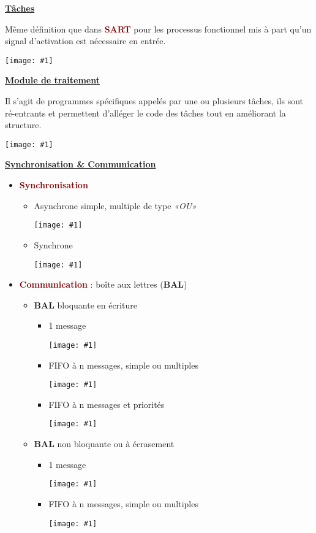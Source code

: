 \documentclass{article}
\newcommand{\dred}[1]{\textcolor{darkred}{\textbf{#1}}}
\newcommand{\imgR}[2]{\begin{center}\texttt{[image: \#1]}\end{center}}
\newcommand{\stitre}[1]{\noindent\textbf{\underline{#1}} \\}
\begin{document}
\stitre{Tâches}

\begin{multicols}{2}
Même définition que dans \dred{SART} pour les processus fonctionnel mis à part qu'un signal d'activation est 
nécessaire en entrée.
\imgR{ITR_013.png}{150}
\end{multicols}

\stitre{Module de traitement}

\begin{multicols}{2}
Il s'agit de programmes spécifiques appelés par une ou plusieurs tâches, ils sont ré-entrants et permettent 
d'alléger le code des tâches tout en améliorant la structure.
\imgR{ITR_014.png}{150}
\end{multicols}

\stitre{Synchronisation \& Communication}

\begin{itemize}
\item \dred{Synchronisation}
	\begin{itemize}
	\item \begin{multicols}{2}
		Asynchrone simple, multiple de type \textit{«OU»}
		\imgR{ITR_015.png}{110}
		\end{multicols}
	\item \begin{multicols}{2}
		Synchrone
		\imgR{ITR_016.png}{50}
		\end{multicols}
	\end{itemize}
\item \dred{Communication} : boîte aux lettres (\textbf{BAL})
	\begin{itemize}
	\item \textbf{BAL} bloquante en écriture
		\begin{itemize}
		\item \begin{multicols}{2}
			1 message
			\imgR{ITR_017.png}{50}
			\end{multicols}
		\item \begin{multicols}{2}
			FIFO à n messages, simple ou multiples
			\imgR{ITR_018.png}{100}
			\end{multicols}
		\item \begin{multicols}{2}
			FIFO à n messages et priorités
			\imgR{ITR_019.png}{50}
			\end{multicols}
		\end{itemize}
	\item \textbf{BAL} non bloquante ou à écrasement
		\begin{itemize}
		\item \begin{multicols}{2}
			1 message
			\imgR{ITR_020.png}{50}
			\end{multicols}
		\item \begin{multicols}{2}
			FIFO à n messages, simple ou multiples
			\imgR{ITR_021.png}{100}
			\end{multicols}
		\end{itemize}	
	\end{itemize}
\end{itemize}
\end{document}
